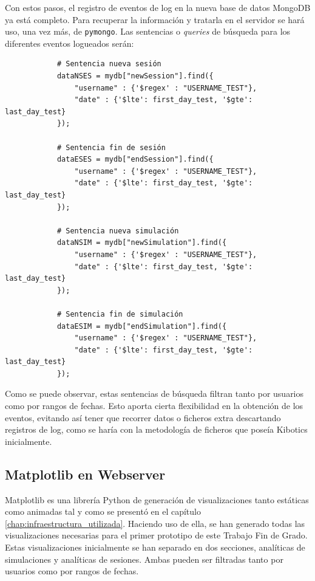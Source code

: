 \documentclass[a4paper, 12pt]{book}
\begin{document}
		Con estos pasos, el registro de eventos de log en la nueva base de datos MongoDB ya está completo. Para recuperar la información y tratarla en el servidor se hará uso, una vez más, de \texttt{pymongo}. Las sentencias o \textit{queries} de búsqueda para los diferentes eventos logueados serán:
		
		
		{\footnotesize
		\begin{verbatim}
			# Sentencia nueva sesión
			dataNSES = mydb["newSession"].find({
			    "username" : {'$regex' : "USERNAME_TEST"}, 
			    "date" : {'$lte': first_day_test, '$gte': last_day_test}
			});
			
			# Sentencia fin de sesión    
			dataESES = mydb["endSession"].find({
			    "username" : {'$regex' : "USERNAME_TEST"}, 
			    "date" : {'$lte': first_day_test, '$gte': last_day_test}
			});
			
			# Sentencia nueva simulación
			dataNSIM = mydb["newSimulation"].find({
			    "username" : {'$regex' : "USERNAME_TEST"}, 
			    "date" : {'$lte': first_day_test, '$gte': last_day_test}
			});
			
			# Sentencia fin de simulación
			dataESIM = mydb["endSimulation"].find({
			    "username" : {'$regex' : "USERNAME_TEST"},
			    "date" : {'$lte': first_day_test, '$gte': last_day_test}
			});
		\end{verbatim}	
		}
	
		Como se puede observar, estas sentencias de búsqueda filtran tanto por usuarios como por rangos de fechas. Esto aporta cierta flexibilidad en la obtención de los eventos, evitando así tener que recorrer datos o ficheros extra descartando registros de log, como se haría con la metodología de ficheros que poseía Kibotics inicialmente.
	
	
	\subsection{Matplotlib en Webserver}
	\label{subsec:matplotlib_kibotics}
		Matplotlib es una librería Python de generación de visualizaciones tanto estáticas como animadas tal y como se presentó en el capítulo \ref{chap:infraestructura_utilizada}. Haciendo uso de ella, se han generado todas las visualizaciones necesarias para el primer prototipo de este Trabajo Fin de Grado.\\
		
		Estas visualizaciones inicialmente se han separado en dos secciones, analíticas de simulaciones y analíticas de sesiones. Ambas pueden ser filtradas tanto por usuarios como por rangos de fechas.\\
		
\end{document}
